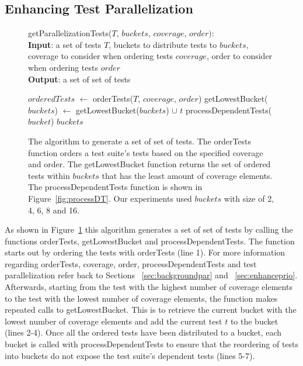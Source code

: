 \subsection{Enhancing Test Parallelization}
\label{sec:enhancepar}
\begin{figure}[t]
	getParallelizationTests($\mathit{T}$, $\mathit{buckets}$, $\mathit{coverage}$,
	$\mathit{order}):$\\
	\textbf{Input}: a set of tests $\mathit{T}$, buckets to distribute tests to
	$\mathit{buckets}$, coverage to consider when ordering tests 
	$\mathit{coverage}$, order to consider when ordering tests $\mathit{order}$\\
	\textbf{Output}: a set of set of tests\\
	 \begin{algorithmic}[1]
	 	\vspace{-5mm}
		\STATE $\mathit{orderedTests}$ $\leftarrow$ orderTests($\mathit{T}$,
		$\mathit{coverage}$, $\mathit{order}$)
			\STATE getLowestBucket($\mathit{buckets}$) $\leftarrow$
			getLowestBucket($\mathit{buckets}$) $\cup$ $\mathit{t}$
		\ENDFOR
			\STATE processDependentTests($\mathit{bucket}$)
		\ENDFOR
		\RETURN $\mathit{buckets}$
	\end{algorithmic}
	\vspace{-3mm}
	\caption {
		The algorithm to generate a set of set of tests. The orderTests function
		orders a test suite's tests based on the specified coverage and order.
		The getLowestBucket function returns the set of ordered tests within
		$\mathit{buckets}$ that has the least amount of coverage elements. The
		processDependentTests function is shown in Figure~\ref{fig:processDT}. Our
		experiments used $\mathit{buckets}$ with size of 2, 4, 6, 8 and 16.
	}
	\label{fig:parallelization}
\end{figure}

As shown in Figure~\ref{fig:parallelization} this algorithm generates a set of
set of tests by calling the functions orderTests, getLowestBucket and
processDependentTests. The function starts out by ordering the tests with
orderTests (line 1). For more information regarding orderTests, coverage, order,
processDependentTests and test parallelization refer back to Sections
 ~\ref{sec:backgroundpar} and ~\ref{sec:enhanceprio}. Afterwards, starting from
the test with the highest number of coverage elements to the test with the
lowest number of coverage elements, the function makes repeated calls to
getLowestBucket. This is to retrieve the current bucket with the lowest number
of coverage elements and add the current test $\mathit{t}$ to the bucket (lines
2-4). Once all the ordered tests have been distributed to a bucket, each bucket
is called with processDependentTests to ensure that the reordering of tests
into buckets do not expose the test suite's dependent tests (lines 5-7).